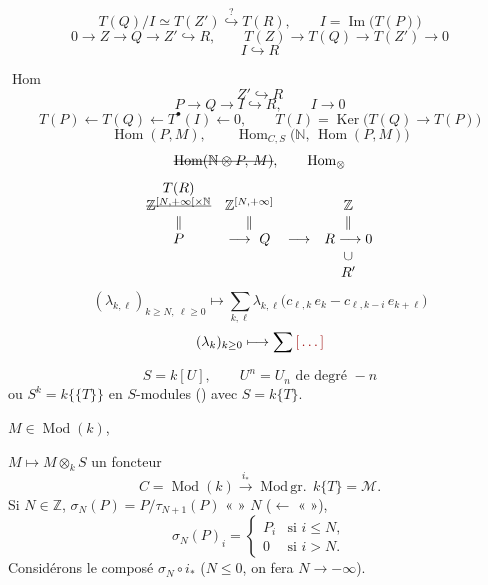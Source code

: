 \documentclass[11pt,a4paper]{article}
\begin{document}

\[
T(Q)/I \simeq T(Z') \overset{?}{\hookrightarrow} T(R), \qquad I = \operatorname{Im}\bigl(T(P)\bigr)
\]
\[
0 \to Z \to Q \to Z' \hookrightarrow R, \qquad T(Z) \to T(Q) \to T(Z') \to 0
\]
\[
I \hookrightarrow R
\]
 \ill{}  \ill{}

  $\operatorname{Hom}$
\[
Z' \hookrightarrow R
\]
\[
P \to Q \to I \hookrightarrow R, \qquad I \to 0
\]
\[
T(P) \leftarrow T(Q) \leftarrow T^{\bullet}(I) \leftarrow 0, \qquad
T(I) = \operatorname{Ker}\bigl(T(Q) \to T(P)\bigr)
\]
\[
\operatorname{Hom}(P,M), \qquad \operatorname{Hom}_{C,S}\bigl(\mathbb{N},\,\operatorname{Hom}(P,M)\bigr)
\]
\[
\text{\struck{$\operatorname{Hom}(\mathbb{N}\otimes P,\,M)$}}, \qquad \operatorname{Hom}_{\otimes}
\]
\[
\begin{matrix}
T(R) & & & \\
\text{\struck{$\mathbb{Z}^{[N,+\infty[\times\mathbb{N}}$}} & \mathbb{Z}^{[N,+\infty]} & & \mathbb{Z}\\
\| & \| & & \|\\
P & \longrightarrow\ Q & \longrightarrow & R \longrightarrow 0\\
 & & & \cup\\
 & & & R'
\end{matrix}
\]
\[
(\lambda_{k,\ell})_{k\geq N,\ \ell\geq 0} \longmapsto \sum_{k,\ell}\lambda_{k,\ell}\bigl(c_{\ell,k}\,e_k - c_{\ell,k-i}\,e_{k+\ell}\bigr)
\]
\[
(\lambda_k)_{k\geq 0} \longmapsto \sum \ill{}
\]

\[
S = k[U], \qquad U^{n} = U_n \text{ de degré } -n
\]
ou $S^{k} = k\{\{T\}\}$ \ill{}  en $S$-modules () avec $S = k\{T\}$.

$M \in \operatorname{Mod}(k)$,

$M \longmapsto M\otimes_k S$ un foncteur
\[
C = \operatorname{Mod}(k) \xrightarrow{\;i_*\;} \operatorname{Mod\,gr.}\,k\{T\} = \mathcal{M}.
\]
Si $N\in\mathbb{Z}$, $\sigma_N(P) = P/\tau_{N+1}(P)$ «  »   $N$ ($\leftarrow$ «  »),
\[
\sigma_N(P)_i = \begin{cases} P_i & \text{si } i\leq N,\\ 0 & \text{si } i>N.\end{cases}
\]
Considérons le composé $\sigma_N\circ i_*$ ($N\leq 0$, on fera $N\to-\infty$).
\end{document}
